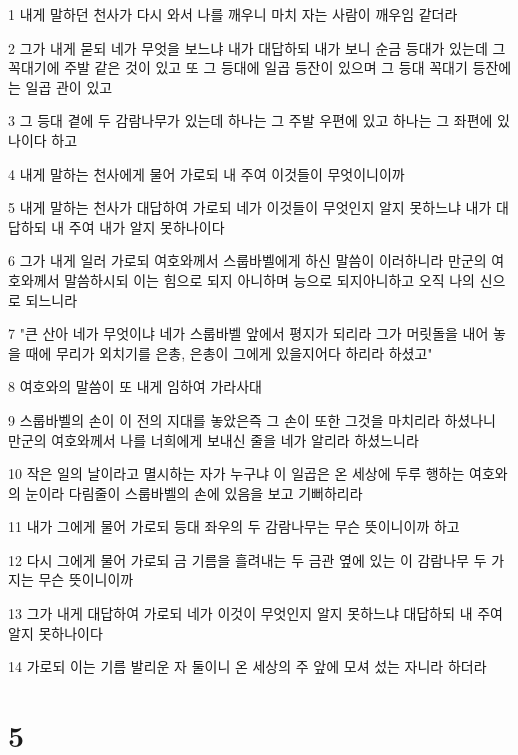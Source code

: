 \par 1 내게 말하던 천사가 다시 와서 나를 깨우니 마치 자는 사람이 깨우임 같더라
\par 2 그가 내게 묻되 네가 무엇을 보느냐 내가 대답하되 내가 보니 순금 등대가 있는데 그 꼭대기에 주발 같은 것이 있고 또 그 등대에 일곱 등잔이 있으며 그 등대 꼭대기 등잔에는 일곱 관이 있고
\par 3 그 등대 곁에 두 감람나무가 있는데 하나는 그 주발 우편에 있고 하나는 그 좌편에 있나이다 하고
\par 4 내게 말하는 천사에게 물어 가로되 내 주여 이것들이 무엇이니이까
\par 5 내게 말하는 천사가 대답하여 가로되 네가 이것들이 무엇인지 알지 못하느냐 내가 대답하되 내 주여 내가 알지 못하나이다
\par 6 그가 내게 일러 가로되 여호와께서 스룹바벨에게 하신 말씀이 이러하니라 만군의 여호와께서 말씀하시되 이는 힘으로 되지 아니하며 능으로 되지아니하고 오직 나의 신으로 되느니라
\par 7 "큰 산아 네가 무엇이냐 네가 스룹바벨 앞에서 평지가 되리라 그가 머릿돌을 내어 놓을 때에 무리가 외치기를 은총, 은총이 그에게 있을지어다 하리라 하셨고"
\par 8 여호와의 말씀이 또 내게 임하여 가라사대
\par 9 스룹바벨의 손이 이 전의 지대를 놓았은즉 그 손이 또한 그것을 마치리라 하셨나니 만군의 여호와께서 나를 너희에게 보내신 줄을 네가 알리라 하셨느니라
\par 10 작은 일의 날이라고 멸시하는 자가 누구냐 이 일곱은 온 세상에 두루 행하는 여호와의 눈이라 다림줄이 스룹바벨의 손에 있음을 보고 기뻐하리라
\par 11 내가 그에게 물어 가로되 등대 좌우의 두 감람나무는 무슨 뜻이니이까 하고
\par 12 다시 그에게 물어 가로되 금 기름을 흘려내는 두 금관 옆에 있는 이 감람나무 두 가지는 무슨 뜻이니이까
\par 13 그가 내게 대답하여 가로되 네가 이것이 무엇인지 알지 못하느냐 대답하되 내 주여 알지 못하나이다
\par 14 가로되 이는 기름 발리운 자 둘이니 온 세상의 주 앞에 모셔 섰는 자니라 하더라

\chapter{5}


